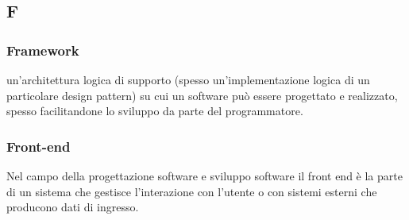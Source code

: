 \subsection*{\textbf{\hfill \Huge{F} \hfill}} 

\subsubsection*{Framework}
un'architettura logica di supporto (spesso un'implementazione logica di un particolare design pattern) su cui un software può essere progettato e realizzato, spesso facilitandone lo sviluppo da parte del programmatore.

\subsubsection*{Front-end}
Nel campo della progettazione software e sviluppo software il front end è la parte di un sistema che gestisce l'interazione con l'utente o con sistemi esterni che producono dati di ingresso.